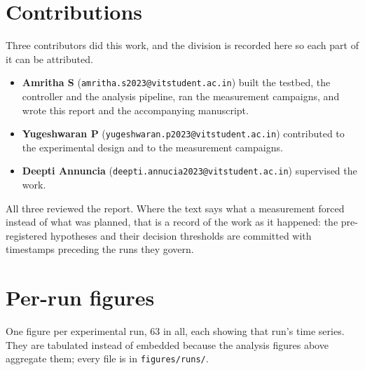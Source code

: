 \documentclass[11pt,a4paper]{article}
\begin{document}
\section{Contributions}

Three contributors did this work, and the division is recorded here so each
part of it can be attributed.

\begin{itemize}[leftmargin=1.4em,itemsep=0.35em]
\item \textbf{Amritha S} (\texttt{amritha.s2023@vitstudent.ac.in}) built the
      testbed, the controller and the analysis pipeline, ran the measurement
      campaigns, and wrote this report and the accompanying manuscript.
\item \textbf{Yugeshwaran P} (\texttt{yugeshwaran.p2023@vitstudent.ac.in})
      contributed to the experimental design and to the measurement
      campaigns.
\item \textbf{Deepti Annuncia}
      (\texttt{deepti.annucia2023@vitstudent.ac.in}) supervised the work.
\end{itemize}

All three reviewed the report. Where the text says what a measurement forced
instead of what was planned, that is a record of the work as it happened: the
pre-registered hypotheses and their decision thresholds are committed with
timestamps preceding the runs they govern.


\appendix

\section{Per-run figures}

One figure per experimental run, 63 in all, each showing that run's time
series. They are tabulated instead of embedded because the analysis figures
above aggregate them; every file is in \texttt{figures/runs/}.
\end{document}
